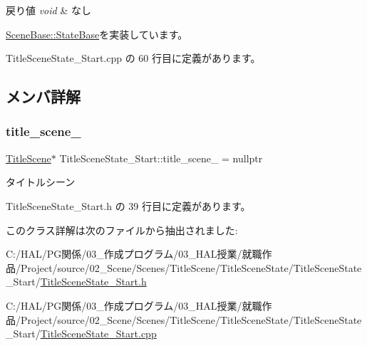 \begin{DoxyRetVals}{戻り値}
{\em void} & なし \\
\hline
\end{DoxyRetVals}


\mbox{\hyperlink{class_scene_base_1_1_state_base_ad2c6c8fd9f020eb02f64f394edee129c}{Scene\+Base\+::\+State\+Base}}を実装しています。



 Title\+Scene\+State\+\_\+\+Start.\+cpp の 60 行目に定義があります。



\subsection{メンバ詳解}
\mbox{\label{class_title_scene_state___start_a1a0dde9e9834cb18e0cf1e1ab12a2129}} 
\subsubsection{\texorpdfstring{title\+\_\+scene\+\_\+}{title\_scene\_}}
{\footnotesize\ttfamily \mbox{\hyperlink{class_title_scene}{Title\+Scene}}$\ast$ Title\+Scene\+State\+\_\+\+Start\+::title\+\_\+scene\+\_\+ = nullptr\hspace{0.3cm}{\ttfamily [private]}}



タイトルシーン 



 Title\+Scene\+State\+\_\+\+Start.\+h の 39 行目に定義があります。



このクラス詳解は次のファイルから抽出されました\+:\begin{DoxyCompactItemize}
\item 
C\+:/\+H\+A\+L/\+P\+G関係/03\+\_\+作成プログラム/03\+\_\+\+H\+A\+L授業/就職作品/\+Project/source/02\+\_\+\+Scene/\+Scenes/\+Title\+Scene/\+Title\+Scene\+State/\+Title\+Scene\+State\+\_\+\+Start/\mbox{\hyperlink{_title_scene_state___start_8h}{Title\+Scene\+State\+\_\+\+Start.\+h}}\item 
C\+:/\+H\+A\+L/\+P\+G関係/03\+\_\+作成プログラム/03\+\_\+\+H\+A\+L授業/就職作品/\+Project/source/02\+\_\+\+Scene/\+Scenes/\+Title\+Scene/\+Title\+Scene\+State/\+Title\+Scene\+State\+\_\+\+Start/\mbox{\hyperlink{_title_scene_state___start_8cpp}{Title\+Scene\+State\+\_\+\+Start.\+cpp}}\end{DoxyCompactItemize}
